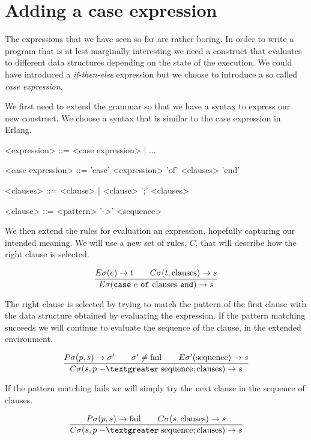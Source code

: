 \documentclass[a4paper,11pt]{article}
\begin{document}
\section{Adding a case expression}

The expressions that we have seen so far are rather boring. In order to
write a program that is at lest marginally interesting we need a
construct that evaluates to different data structures depending on the
state of the execution. We could have introduced a {\em if-then-else}
expression but we choose to introduce a so called {\em case expression}.

We first need to extend the grammar so that we have a syntax to express
our new construct. We choose a syntax that is similar to the case
expression in Erlang.

\begin{grammar}
     <expression> ::=  <case expression> | ...  

     <case expression> ::= 'case' <expression> 'of' <clauses>  'end' 

     <clauses> ::=   <clause> | <clause> ';' <clauses>

     <clause> ::=  <pattern> '-\textgreater' <sequence>
\end{grammar}

We then extend the rules for evaluation an expression, hopefully
capturing our intended meaning. We will use a new set of rules, $C$,
that will describe how the right clause is selected. 


$$\frac{E\sigma(e) \rightarrow t \qquad C\sigma(t, {\rm clauses}) \rightarrow s }{E\sigma({\tt case}\ e \ {\tt of}\ {\rm clauses} \ {\tt end}) \rightarrow s}$$

The right clause is selected by trying to match the pattern of the
first clause with the data structure obtained by evaluating the
expression. If the pattern matching succeeds we will continue to
evaluate the sequence of the clause, in the extended environment.

$$\frac{P\sigma(p, s) \rightarrow \sigma' \qquad \sigma' \not = {\rm fail} \qquad E\sigma'({\rm sequence}) \rightarrow s}{
C\sigma(s, p \;{\rm -\textgreater}\;    {\rm sequence} ; {\rm clauses}) \rightarrow s}$$

If the pattern matching fails we will simply try the next clause in
the sequence of clauses.

$$\frac{P\sigma(p, s) \rightarrow {\rm fail} \qquad
  C\sigma(s, {\rm clauses}) \rightarrow s}{
C\sigma(s, p \;{\rm -\textgreater}\;  {\rm sequence} ; {\rm clauses}) \rightarrow s}$$
\end{document}
